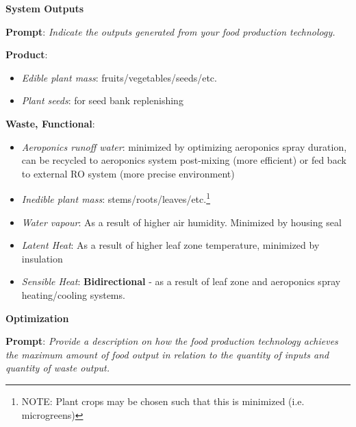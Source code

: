 \documentclass{report}
\begin{document}
\newpage

\textbf{System Outputs}
\label{sec:resource-outputs}

\textbf{Prompt}: \textit{Indicate the outputs generated from your food production technology. }


\textbf{Product}:

\begin{itemize}
    \item \textit{Edible plant mass}: fruits/vegetables/seeds/etc.
    \item \textit{Plant seeds}: for seed bank replenishing
\end{itemize}

\textbf{Waste, Functional}:

\begin{itemize}
    \item \textit{Aeroponics runoff water}: minimized by optimizing aeroponics spray duration, can be recycled to aeroponics system post-mixing (more efficient) or fed back to external RO system (more precise environment)
    \item \textit{Inedible plant mass}: stems/roots/leaves/etc.\footnote{NOTE: Plant crops may be chosen such that this is minimized (i.e. microgreens)}
    \item \textit{Water vapour}: As a result of higher air humidity. Minimized by housing seal
    \item \textit{Latent Heat}: As a result of higher leaf zone temperature, minimized by insulation
    \item \textit{Sensible Heat}: \textbf{Bidirectional} - as a result of leaf zone and aeroponics spray heating/cooling systems.
\end{itemize}

\textbf{Optimization}
\label{sec:resource-optimization}

\textbf{Prompt}: \textit{Provide a description on how the food production technology achieves the maximum amount of food output in relation to the quantity of inputs and quantity of waste output.} 

\end{document}
